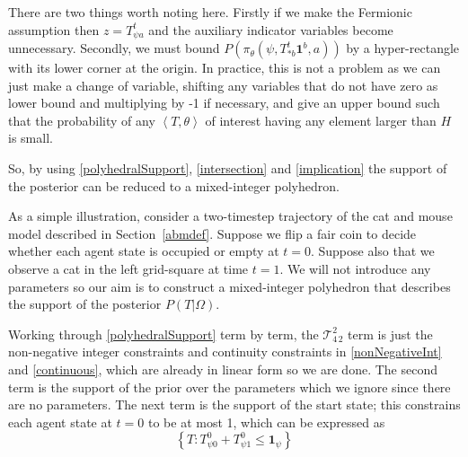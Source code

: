 \documentclass{article}
\begin{document}
There are two things worth noting here. Firstly if we make the Fermionic assumption then $z = T^t_{\psi a}$ and the auxiliary indicator variables become unnecessary. Secondly, we must bound $P(\pi_\theta(\psi,T^t_{*b}\mathbf{1}^b,a))$ by a hyper-rectangle with its lower corner at the origin. In practice, this is not a problem as we can just make a change of variable, shifting any variables that do not have zero as lower bound and multiplying by -1 if necessary, and give an upper bound such that the probability of any $\left<T,\theta\right>$ of interest having any element larger than $H$ is small.

So, by using \eqref{polyhedralSupport}, \eqref{intersection} and \eqref{implication} the support of the posterior can be reduced to a mixed-integer polyhedron.

As a simple illustration, consider a two-timestep trajectory of the cat and mouse model described in Section~\ref{abmdef}. Suppose we flip a fair coin to decide whether each agent state is occupied or empty at $t=0$. Suppose also that we observe a cat in the left grid-square at time $t=1$. We will not introduce any parameters so our aim is to construct a mixed-integer polyhedron that describes the support of the posterior $P(T|\Omega)$.

Working through \eqref{polyhedralSupport} term by term, the $\mathcal{T}^2_{4\,2}$ term is just the non-negative integer constraints and continuity constraints in \eqref{nonNegativeInt} and \eqref{continuous}, which are already in linear form so we are done. The second term is the support of the prior over the parameters which we ignore since there are no parameters. The next term is the support of the start state; this constrains each agent state at $t=0$ to be at most 1, which can be expressed as
\[
\left\{T:T^0_{\psi 0} + T^0_{\psi 1} \le \mathbf{1}_{\psi}\right\}
\]
\end{document}
